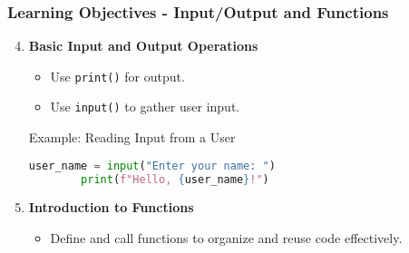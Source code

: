 \documentclass{beamer}
\begin{document}
\begin{frame}[fragile]
    \frametitle{Learning Objectives - Input/Output and Functions}
    \begin{enumerate}
        \setcounter{enumi}{3} %
        \item \textbf{Basic Input and Output Operations}
        \begin{itemize}
            \item Use \texttt{print()} for output.
            \item Use \texttt{input()} to gather user input.
        \end{itemize}
        
        \begin{block}{Example: Reading Input from a User}
        \begin{lstlisting}[language=Python]
        user_name = input("Enter your name: ")
        print(f"Hello, {user_name}!")
        \end{lstlisting}
        \end{block}
        
        \item \textbf{Introduction to Functions}
        \begin{itemize}
            \item Define and call functions to organize and reuse code effectively.
        \end{itemize}
    \end{enumerate}
\end{frame}
\end{document}
